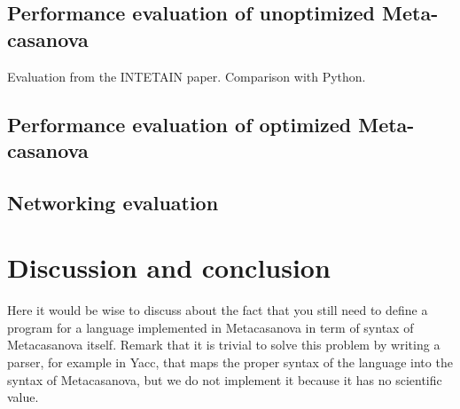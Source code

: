 \documentclass[8pt,a5paper]{extbook}
\begin{document}
\section{Performance evaluation of unoptimized Meta-casanova}
	Evaluation from the INTETAIN paper. Comparison with Python. 

\section{Performance evaluation of optimized Meta-casanova}

\section{Networking evaluation}

\chapter{Discussion and conclusion}
Here it would be wise to discuss about the fact that you still need to define a program for a language implemented in Metacasanova in term of syntax of Metacasanova itself. Remark that it is trivial to solve this problem by writing a parser, for example in Yacc, that maps the proper syntax of the language into the syntax of Metacasanova, but we do not implement it because it has no scientific value.
\end{document}
